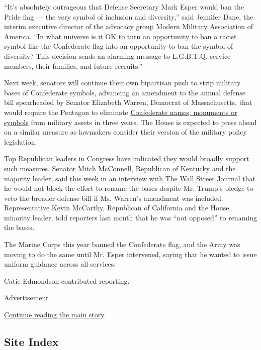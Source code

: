 ``It's absolutely outrageous that Defense Secretary Mark Esper would ban
the Pride flag --- the very symbol of inclusion and diversity,'' said
Jennifer Dane, the interim executive director of the advocacy group
Modern Military Association of America. ``In what universe is it OK to
turn an opportunity to ban a racist symbol like the Confederate flag
into an opportunity to ban the symbol of diversity? This decision sends
an alarming message to L.G.B.T.Q. service members, their families, and
future recruits.''

Next week, senators will continue their own bipartisan push to strip
military bases of Confederate symbols, advancing an amendment to the
annual defense bill spearheaded by Senator Elizabeth Warren, Democrat of
Massachusetts, that would require the Pentagon to eliminate
\href{https://www.nytimes.com/2020/06/11/us/politics/senate-confederate-names-military-bases.html}{Confederate
names, monuments or symbols} from military assets in three years. The
House is expected to press ahead on a similar measure as lawmakers
consider their version of the military policy legislation.

Top Republican leaders in Congress have indicated they would broadly
support such measures. Senator Mitch McConnell, Republican of Kentucky
and the majority leader, said this week in an interview
\href{https://slack-redir.net/link?url=https\%3A\%2F\%2Fwww.wsj.com\%2Farticles\%2Fmitch-mcconnell-signals-limits-on-race-related-policy-changes-11594733555}{with
The Wall Street Journal} that he would not block the effort to rename
the bases despite Mr. Trump's pledge to veto the broader defense bill if
Ms. Warren's amendment was included. Representative Kevin McCarthy,
Republican of California and the House minority leader, told reporters
last month that he was ``not opposed'' to renaming the bases.

The Marine Corps this year banned the Confederate flag, and the Army was
moving to do the same until Mr. Esper intervened, saying that he wanted
to issue uniform guidance across all services.

Catie Edmondson contributed reporting.

Advertisement

\protect\hyperlink{after-bottom}{Continue reading the main story}

\hypertarget{site-index}{%
\subsection{Site Index}\label{site-index}}

